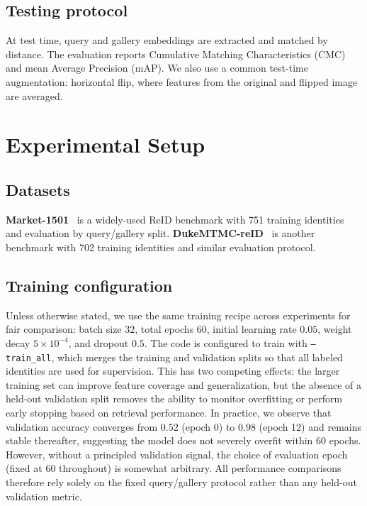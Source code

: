 \documentclass[sigconf,nonacm]{acmart}
\begin{document}
\subsection{Testing protocol}
At test time, query and gallery embeddings are extracted and matched by distance.
The evaluation reports Cumulative Matching Characteristics (CMC) and mean Average Precision (mAP).
We also use a common test-time augmentation: horizontal flip, where features from the original and flipped image are averaged.

\section{Experimental Setup}
\subsection{Datasets}
\textbf{Market-1501}~\cite{zheng2015scalable} is a widely-used ReID benchmark with 751 training identities and evaluation by query/gallery split.
\textbf{DukeMTMC-reID}~\cite{ristani2016performance,zheng2017unlabeled} is another benchmark with 702 training identities and similar evaluation protocol.

\subsection{Training configuration}
Unless otherwise stated, we use the same training recipe across experiments for fair comparison: batch size $32$, total epochs $60$, initial learning rate $0.05$, weight decay $5\times 10^{-4}$, and dropout $0.5$.
The code is configured to train with \texttt{--train\_all}, which merges the training and validation splits so that all labeled identities are used for supervision.
This has two competing effects: the larger training set can improve feature coverage and generalization, but the absence of a held-out validation split removes the ability to monitor overfitting or perform early stopping based on retrieval performance.
In practice, we observe that validation accuracy converges from $0.52$ (epoch 0) to $0.98$ (epoch 12) and remains stable thereafter, suggesting the model does not severely overfit within 60 epochs.
However, without a principled validation signal, the choice of evaluation epoch (fixed at 60 throughout) is somewhat arbitrary.
All performance comparisons therefore rely solely on the fixed query/gallery protocol rather than any held-out validation metric.
\end{document}
